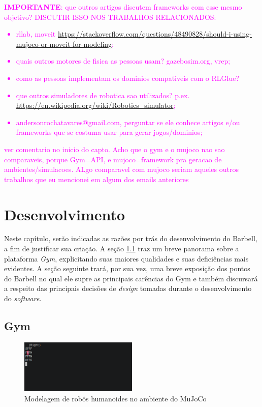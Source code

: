 \documentclass[cic,tc]{iiufrgs}
\newcommand\bruno[1]{\textcolor{magenta}{#1}}
\begin{document}
\bruno{\textbf{IMPORTANTE}: que outros artigos discutem frameworks com esse mesmo objetivo? DISCUTIR ISSO NOS TRABALHOS RELACIONADOS:
\begin{itemize}
    \item rllab, moveit \url{https://stackoverflow.com/questions/48490828/should-i-using-mujoco-or-moveit-for-modeling};
    \item quais outros motores de fisica as pessoas usam? gazebosim.org, vrep;
    \item como as pessoas implementam os dominios compativeis com o RLGlue?
    \item que outros simuladores de robotica sao utilizados? p.ex. \url{https://en.wikipedia.org/wiki/Robotics_simulator};
    \item andersonrochatavares@gmail.com, perguntar se ele conhece artigos e/ou frameworks que se costuma usar para gerar jogos/dominios;
\end{itemize}
}


\bruno{ver comentario no inicio do capto. Acho que o gym e o mujoco nao sao comparaveis, porque Gym=API, e mujoco=framework pra geracao de ambientes/simulacoes. ALgo comparavel com mujoco seriam aqueles outros trabalhos que eu mencionei em algum dos emails anteriores}

\chapter{Desenvolvimento}
\label{desenvolvimento}


Neste capítulo, serão indicadas as razões por trás do desenvolvimento do
Barbell, a fim de justificar sua criação. A seção \ref{sec:gym} traz um breve
panorama sobre a plataforma \textit{Gym}, explicitando suas maiores qualidades e
suas deficiências mais evidentes. A seção seguinte trará, por sua vez, uma breve
exposição dos pontos do Barbell no qual ele supre as principais carências do
Gym e também discursará a respeito das principais decisões de \textit{design}
tomadas durante o desenvolvimento do \textit{software}.

\section{Gym}
\label{sec:gym}

\begin{figure}[h]
    \caption{Modelagem de robôs humanoides no ambiente do MuJoCo}
    \begin{center}
      \includegraphics[width=0.5\textwidth]{frozen_lake.png}
    \end{center}
    \label{fig:frozen_lake2s}
\end{figure}
\end{document}
